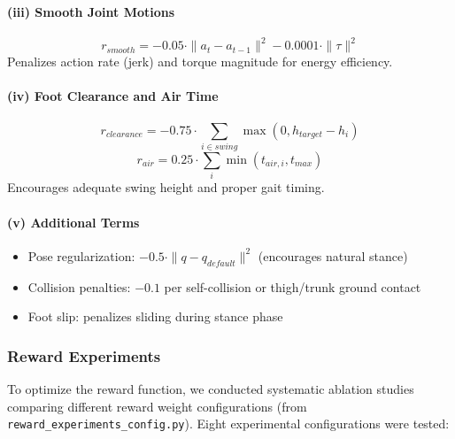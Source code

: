 \documentclass[12pt,a4paper]{article}
\begin{document}
\paragraph{(iii) Smooth Joint Motions}
\begin{equation}
r_{smooth} = -0.05 \cdot \|a_t - a_{t-1}\|^2 - 0.0001 \cdot \|\tau\|^2
\end{equation}
Penalizes action rate (jerk) and torque magnitude for energy efficiency.

\paragraph{(iv) Foot Clearance and Air Time}
\begin{equation}
r_{clearance} = -0.75 \cdot \sum_{i \in swing} \max(0, h_{target} - h_i)
\end{equation}
\begin{equation}
r_{air} = 0.25 \cdot \sum_{i} \min(t_{air,i}, t_{max})
\end{equation}
Encourages adequate swing height and proper gait timing.

\paragraph{(v) Additional Terms}
\begin{itemize}
    \item Pose regularization: $-0.5 \cdot \|q - q_{default}\|^2$ (encourages natural stance)
    \item Collision penalties: $-0.1$ per self-collision or thigh/trunk ground contact
    \item Foot slip: penalizes sliding during stance phase
\end{itemize}

\subsubsection{Reward Experiments}

To optimize the reward function, we conducted systematic ablation studies comparing different reward weight configurations (from \texttt{reward\_experiments\_config.py}). Eight experimental configurations were tested:
\end{document}
